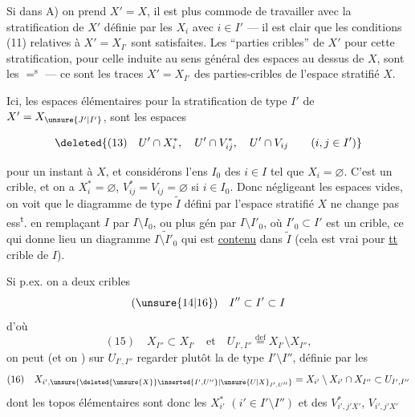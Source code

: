 Si dans A) on prend $X'=X$, il est plus commode de travailler avec la stratification de $X'$ définie par les $X_i$ avec $i\in I'$ --- il est clair que les conditions (11) relatives à $X'=X_{I'}$ sont satisfaites. Les ``parties cribles'' de $X'$ pour cette stratification,  pour celle induite au sens général des espaces au dessus de $X$, sont les $=^{\mathrm s}$ --- ce sont  les traces   $X'=X_{I'}$ des parties-cribles de l'espace stratifié $X$.

Ici, les espaces élémentaires pour la stratification de type $I'$ de  $X'=X_{\unsure{J'|I'}}$, sont les espaces

\[
\deleted{(13)\quad U'\cap X_i^*,\quad U'\cap V_{ij}^*,\quad U'\cap V_{ij}\qquad(i,j\in I')}
\]


 pour un instant à $X$, et
considérons l'ens  $I_0$ des $i\in I$ tel que
$X_i=\varnothing$. C'est un crible, et on a
$X_i^*=\varnothing$, $V_{ij}^*=V_{ij}=\varnothing$ si $i\in I_0$. Donc négligeant
les espaces vides, on voit que le diagramme
de type $\widetilde I$ défini par l'espace stratifié $X$
ne change pas ess\textsuperscript{t}. en remplaçant $I$ par
$I\setminus I_0$, ou plus gén par $I\setminus I'_0$, où $I'_0\subset I'$
est un crible,
ce qui donne lieu  un diagramme
$\widetilde{I\setminus I'_0}$ qui est \uline{contenu} dans $\widetilde I$ (cela est
vrai pour \uline{tt} crible de $I$).

Si p.ex. on a deux cribles
\[
(\unsure{14|16})\quad I''\subset I'\subset I
\]
d'où
\[
(15)\quad X_{I''}\subset X_{I'}\quad\text{et}\quad U_{I',I''}\overset{\mathrm{def}}{=}X_{I'}\setminus X_{I''},
\]
on peut  (et on ) sur $U_{I',I''}$ regarder
plutôt la   de type $I'\setminus I''$,
définie par les 
\[
(16)\quad X_{i',\unsure{\deleted{\unsure{X}}\inserted{I',U''}|\unsure{U|X}_{I',U''}}}=X_{i'}\setminus X_{i'}\cap X_{I''}\subset U_{I',I''}
\]
dont les topos élémentaires sont donc les
$X_{i'}^*$ $(i'\in I'\setminus I'')$ et des $V^*_{i',j'X'}$, $V_{i',j'X'}$

